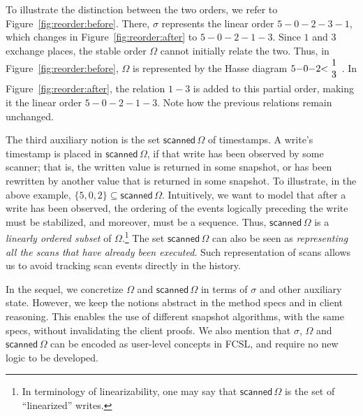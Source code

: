 \documentclass[a4paper,UKenglish]{lipics-v2016}
\def\ordlist{\sigma}
\newcommand{\tleq}{\mathrel{\leq_\ordlist}}
\newcommand{\stableorder}{\Omega}
\theoremstyle{definition}
\begin{document}
%

To illustrate the distinction between the two orders, we refer to
Figure~\ref{fig:reorder:before}. There, $\ordlist$ represents the
linear order $5{-}0{-}2{-}3{-}1$, which changes in
Figure~\ref{fig:reorder:after} to $5{-}0{-}2{-}1{-}3$.
%
Since $1$ and $3$ exchange places, the stable order $\stableorder$
cannot initially relate the two. Thus, in
Figure~\ref{fig:reorder:before}, $\stableorder$ is represented by the
Hasse diagram $5{-}0{-}2{<}\!\begin{array}[c]{c}1\\ 3\end{array}$. In
Figure~\ref{fig:reorder:after}, the relation $1{-}3$ is added to this
partial order, making it the linear order $5{-}0{-}2{-}1{-}3$. Note
how the previous relations remain unchanged.

\newcommand{\scanned}[1]{\mathsf{scanned}\,#1}

The third auxiliary notion is the set $\scanned\stableorder$ of
timestamps. A write's timestamp is placed in $\scanned\stableorder$,
if that write has been observed by some scanner; that is, the written
value is returned in some snapshot, or has been rewritten by another
value that is returned in some snapshot. To illustrate, in the above
example, $\{5, 0, 2\} \subseteq \scanned\stableorder$.  Intuitively,
we want to model that after a write has been observed, the ordering of
the events logically preceding the write must be stabilized, and
moreover, must be a sequence. Thus,
$\scanned\stableorder$ is a \emph{linearly ordered subset} of
$\stableorder$.\footnote{In terminology of linearizability, one may
  say that $\scanned\stableorder$ is the set of ``linearized''
  writes.}  The set $\scanned\stableorder$ can also be seen as
\emph{representing all the scans that have already been
  executed}. Such representation of scans allows us to avoid tracking
scan events directly in the history.

In the sequel, we concretize $\stableorder$ and
$\scanned\stableorder$ in terms of $\ordlist$ and other auxiliary
state. However, we keep the notions abstract in the method specs and
in client reasoning. This enables the use of different snapshot
algorithms, with the same specs, without invalidating the client
proofs. We also mention that $\ordlist$, $\stableorder$ and
$\scanned\stableorder$ can be encoded as user-level concepts in FCSL,
and require no new logic to be developed.
\end{document}
